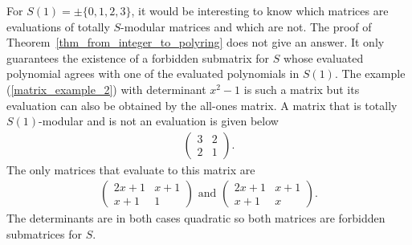 \documentclass[a4paper, 11pt]{article}
\newcommand{\indet}{x}
\newcommand{\polyS}{S}
\begin{document}
		For $S(1) = \pm\lbrace 0,1,2,3\rbrace$, it would be interesting to know which matrices are evaluations of totally $\polyS$-modular matrices and which are not. The proof of Theorem~\ref{thm_from_integer_to_polyring} does not give an answer. It only guarantees the existence of a forbidden submatrix for $\polyS$ whose evaluated polynomial agrees with one of the evaluated polynomials in $S(1)$. The example (\ref{matrix_example_2}) with determinant $x^2-1$ is such a matrix but its evaluation can also be obtained by the all-ones matrix. A matrix that is totally $S(1)$-modular and is not an evaluation is given below
		\begin{align*}
			\begin{pmatrix}
				3 & 2 \\
				2 & 1
			\end{pmatrix}.
		\end{align*}
		The only matrices that evaluate to this matrix are
		\begin{align*}
			\begin{pmatrix}
				2\indet + 1 & \indet + 1\\ 
				\indet + 1 & 1
			\end{pmatrix}\text{ and }\begin{pmatrix}
				2\indet + 1 & \indet + 1\\ 
				\indet + 1 & \indet
			\end{pmatrix}.
		\end{align*}
		The determinants are in both cases quadratic so both matrices are forbidden submatrices for $\polyS$.
		
\end{document}

